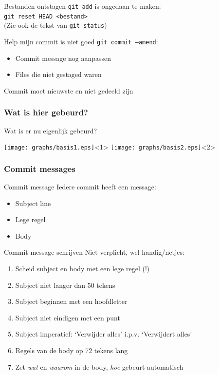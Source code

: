 \begin{frame}{Bestanden ontstagen}
	\texttt{git add} is ongedaan te maken:\\
	\texttt{git reset HEAD <bestand>}\\
	(Zie ook de tekst van \texttt{git status})
\end{frame}

\begin{frame}{Help mijn commit is niet goed}
	\texttt{git commit --amend}:
	\begin{itemize}
		\item Commit message nog aanpassen
		\item Files die niet gestaged waren
	\end{itemize}
	\alert{Commit moet nieuwste en niet gedeeld zijn}
\end{frame}

\subsubsection{Wat is hier gebeurd?}
\begin{frame}{Wat is er nu eigenlijk gebeurd?}
	\begin{center}
		\texttt{[image: graphs/basis1.eps]}<1>
		\texttt{[image: graphs/basis2.eps]}<2>
	\end{center}
\end{frame}

\subsubsection{Commit messages}
\begin{frame}{Commit message}
	Iedere commit heeft een message:
	\begin{itemize}
		\item Subject line
		\item Lege regel
		\item Body
	\end{itemize}
\end{frame}

\begin{frame}{Commit message schrijven}
	Niet verplicht, wel handig/netjes:
	\begin{enumerate}
		\item Scheid subject en body met een lege regel (!)
		\item Subject niet langer dan 50 tekens
		\item Subject beginnen met een hoofdletter
		\item Subject niet eindigen met een punt
		\item Subject imperatief: `Verwijder alles' i.p.v. `Verwijdert alles'
		\item Regels van de body op 72 tekens lang
		\item Zet \emph{wat} en \emph{waarom} in de body, \emph{hoe} gebeurt automatisch
	\end{enumerate}
\end{frame}

